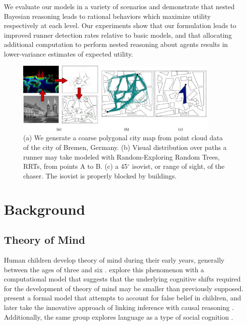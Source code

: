\documentclass[twoside]{article}
\begin{document}
We evaluate our models in a variety of scenarios and demonstrate that nested Bayesian reasoning leads to rational behaviors which maximize utility respectively at each level. Our experiments show that our formulation leads to improved runner detection rates relative to basic models, and that allocating additional computation to perform nested reasoning about agents results in lower-variance estimates of expected utility. 






\begin{figure}
\begin{center}
\vspace{-1.0em}
\centerline{\includegraphics[width=0.9\textwidth]{sim_primitives.eps}}
\caption{(a) We generate a coarse polygonal city map from point cloud data of the city of Bremen, Germany. (b) Visual distribution over paths a runner may take
modeled with Random-Exploring Random Trees, RRTs, from points A to B. (c) a 45$^{\circ}$ isovist, or range of sight, of the
chaser.  The isovist is properly blocked by buildings.}
\label{fig:rrt}
\end{center}
\vspace{-1.0em}
\end{figure} 

\section{Background}

\subsection{Theory of Mind}

Human children develop theory of mind during their
early years, generally between the ages of three and
six
\cite{wellman1990child,chater2006probabilistic}. \textcite{bello2006developmental}
explore this phenomenon with a computational model that suggests that the underlying cognitive shifts required for the development of theory of mind may be smaller than previously supposed. 
%
\textcite{goodman2006intuitive} present a formal model that
attempts to account for false belief in
children, and later take the innovative approach of
linking inference with causal reasoning \cite{goodman2009cause}. Additionally, the same group explores language as a type of social
cognition \cite{goodman2013knowledge}.
%
\end{document}
